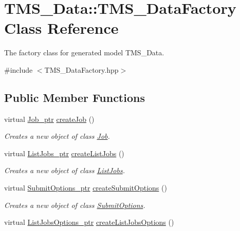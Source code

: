 \hypertarget{classTMS__Data_1_1TMS__DataFactory}{
\section{TMS\_\-Data::TMS\_\-DataFactory Class Reference}
\label{classTMS__Data_1_1TMS__DataFactory}
}


The factory class for generated model TMS\_\-Data.  




{\ttfamily \#include $<$TMS\_\-DataFactory.hpp$>$}

\subsection*{Public Member Functions}
\begin{DoxyCompactItemize}
\item 
virtual \hyperlink{classTMS__Data_1_1Job}{Job\_\-ptr} \hyperlink{classTMS__Data_1_1TMS__DataFactory_a3ef2ff2f9ac67357824a75ab0396ad15}{createJob} ()
\begin{DoxyCompactList}\small\item\em Creates a new object of class \hyperlink{classTMS__Data_1_1Job}{Job}. \item\end{DoxyCompactList}\item 
virtual \hyperlink{classTMS__Data_1_1ListJobs}{ListJobs\_\-ptr} \hyperlink{classTMS__Data_1_1TMS__DataFactory_ab087c484386a75b3a47b71fa76c4111a}{createListJobs} ()
\begin{DoxyCompactList}\small\item\em Creates a new object of class \hyperlink{classTMS__Data_1_1ListJobs}{ListJobs}. \item\end{DoxyCompactList}\item 
virtual \hyperlink{classTMS__Data_1_1SubmitOptions}{SubmitOptions\_\-ptr} \hyperlink{classTMS__Data_1_1TMS__DataFactory_a5ca0e154736aa1e776d6765b477d019b}{createSubmitOptions} ()
\begin{DoxyCompactList}\small\item\em Creates a new object of class \hyperlink{classTMS__Data_1_1SubmitOptions}{SubmitOptions}. \item\end{DoxyCompactList}\item 
virtual \hyperlink{classTMS__Data_1_1ListJobsOptions}{ListJobsOptions\_\-ptr} \hyperlink{classTMS__Data_1_1TMS__DataFactory_a95a3665f815a62fcc386236d87749bb8}{createListJobsOptions} ()

\end{DoxyCompactItemize}
